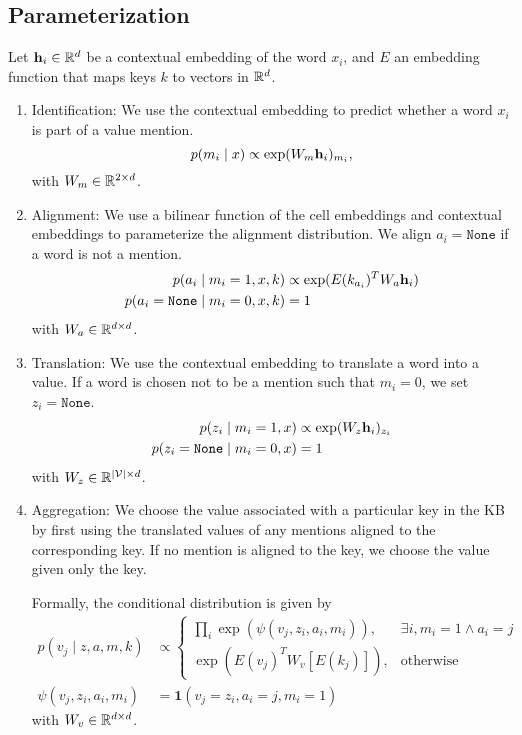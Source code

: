 \documentclass[12pt]{article}
\begin{document}
\subsection{Parameterization}
Let $\mathbf{h}_i \in \mathbb{R}^d$ be a contextual embedding of the word $x_i$,
and $E$ an embedding function that maps keys $k$ to vectors in $\mathbb{R}^{d}$.
\begin{enumerate}
\item Identification: We use the contextual embedding to  predict
whether a word $x_i$ is part of a value mention.
\begin{equation}
p(m_i \mid x) \propto \exp(W_m\mathbf{h}_i)_{m_i},
\end{equation}
with $W_m \in \mathbb{R}^{2 \times d}$.
\item Alignment: We use a bilinear function of the cell embeddings and
contextual embeddings to parameterize the alignment distribution.
We align $a_i = \texttt{None}$ if a word is not a mention.
\begin{equation}
\begin{aligned}
p(a_i \mid m_i=1,x,k) &\propto \exp(E(k_{a_i})^T W_a \mathbf{h}_i)\\
p(a_i=\texttt{None} \mid m_i=0,x,k) &= 1
\end{aligned}
\end{equation}
with $W_a \in \mathbb{R}^{d \times d}$.
\item Translation: We use the contextual embedding to translate a word
into a value. 
If a word is chosen not to be a mention such that $m_i=0$,
we set $z_i = \texttt{None}$.
\begin{equation}
\begin{aligned}
p(z_i \mid m_i=1, x) &\propto \exp(W_z \mathbf{h}_i)_{z_i}\\
p(z_i = \texttt{None} \mid m_i=0, x) &= 1
\end{aligned}
\end{equation}
with $W_z \in \mathbb{R}^{|\mathcal{V}| \times d}$.
\item Aggregation:
We choose the value associated with a particular key in the KB
by first using the translated values of any mentions aligned to the
corresponding key.
If no mention is aligned to the key, we choose the value given only the key.

Formally, the conditional distribution is given by
\begin{align}
p(v_j \mid z,a,m,k) &\propto \begin{cases}
    \prod_{i}
        \exp(\psi(v_j, z_i,a_i,m_i)),  & \exists i, m_i = 1 \wedge a_i = j\\
    \exp(E(v_j)^TW_v [E(k_j)]), & \textrm{otherwise}
\end{cases}\\
\psi(v_j, z_i, a_i, m_i) &= \mathbf{1}(v_j = z_i, a_i = j, m_i=1)%
\end{align}
with $W_v \in \mathbb{R}^{d\times d}$.
\end{enumerate}
\end{document}
